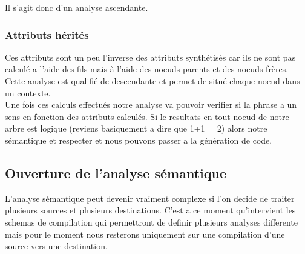 Il s'agit donc d'un analyse ascendante.

\subsubsection{Attributs hérités}
 Ces attributs sont un peu l'inverse des attributs synthétisés car ils ne sont
 pas calculé a l'aide des fils mais à l'aide des noeuds parents et des noeuds
 frères. Cette analyse est qualifié de descendante et permet de situé chaque
 noeud dans un contexte.
\\
 Une fois ces calculs effectués notre analyse va pouvoir verifier si la phrase a
 un sens en fonction des attributs calculés. Si le resultats en tout noeud de
 notre arbre est logique (reviens basiquement a dire que 1+1 = 2) alors notre
 sémantique et respecter et nous pouvons passer a la génération de code.

\subsection{Ouverture de l'analyse sémantique}
    L'analyse sémantique peut devenir vraiment complexe si l'on decide de
    traiter plusieurs sources et plusieurs destinations. C'est a ce moment
    qu'intervient les schemas de compilation qui permettront de definir
    plusieurs analyses differente mais pour le moment nous resterons uniquement
    sur une compilation d'une source vers une destination. 
